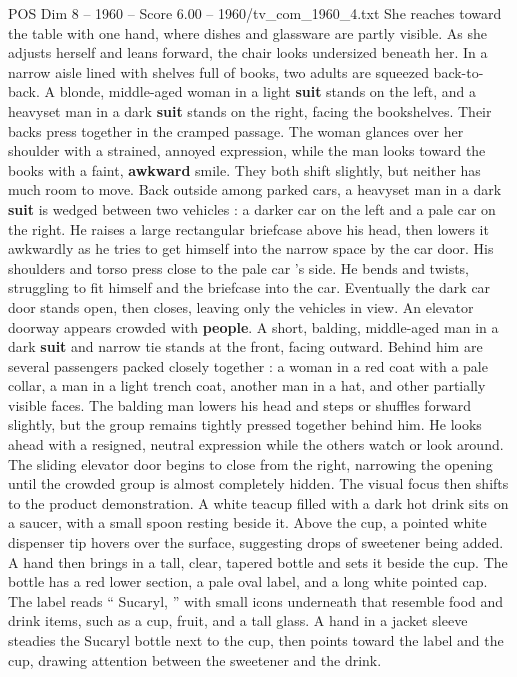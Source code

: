 \begin{textsample}{POS Dim 8 – 1960 – Score 6.00 – 1960/tv\_com\_1960\_4.txt}
She reaches toward the table with one hand, where dishes and glassware are partly visible.
As she adjusts herself and leans forward, the chair looks undersized beneath her.
In a narrow aisle lined with shelves full of books, two adults are squeezed back-to-back.
A blonde, middle-aged woman in a light \textbf{suit} stands on the left, and a heavyset man in a dark \textbf{suit} stands on the right, facing the bookshelves.
Their backs press together in the cramped passage.
The woman glances over her shoulder with a strained, annoyed expression, while the man looks toward the books with a faint, \textbf{awkward} smile.
They both shift slightly, but neither has much room to move.
Back outside among parked cars, a heavyset man in a dark \textbf{suit} is wedged between two vehicles : a darker car on the left and a pale car on the right.
He raises a large rectangular briefcase above his head, then lowers it awkwardly as he tries to get himself into the narrow space by the car door.
His shoulders and torso press close to the pale car ’s side.
He bends and twists, struggling to fit himself and the briefcase into the car.
Eventually the dark car door stands open, then closes, leaving only the vehicles in view.
An elevator doorway appears crowded with \textbf{people}.
A short, balding, middle-aged man in a dark \textbf{suit} and narrow tie stands at the front, facing outward.
Behind him are several passengers packed closely together : a woman in a red coat with a pale collar, a man in a light trench coat, another man in a hat, and other partially visible faces.
The balding man lowers his head and steps or shuffles forward slightly, but the group remains tightly pressed together behind him.
He looks ahead with a resigned, neutral expression while the others watch or look around.
The sliding elevator door begins to close from the right, narrowing the opening until the crowded group is almost completely hidden.
The visual focus then shifts to the product demonstration.
A white teacup filled with a dark hot drink sits on a saucer, with a small spoon resting beside it.
Above the cup, a pointed white dispenser tip hovers over the surface, suggesting drops of sweetener being added.
A hand then brings in a tall, clear, tapered bottle and sets it beside the cup.
The bottle has a red lower section, a pale oval label, and a long white pointed cap.
The label reads “ Sucaryl, ” with small icons underneath that resemble food and drink items, such as a cup, fruit, and a tall glass.
A hand in a jacket sleeve steadies the Sucaryl bottle next to the cup, then points toward the label and the cup, drawing attention between the sweetener and the drink.

\end{textsample}
